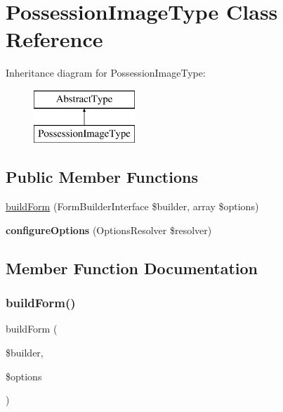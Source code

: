 \hypertarget{class_app_1_1_forms_1_1_possession_image_type}{}\section{Possession\+Image\+Type Class Reference}
\label{class_app_1_1_forms_1_1_possession_image_type}
Inheritance diagram for Possession\+Image\+Type\+:\begin{figure}[H]
\begin{center}
\leavevmode
\includegraphics[height=2.000000cm]{class_app_1_1_forms_1_1_possession_image_type}
\end{center}
\end{figure}
\subsection*{Public Member Functions}
\begin{DoxyCompactItemize}
\item 
\mbox{\hyperlink{class_app_1_1_forms_1_1_possession_image_type_a83c3745710374f9c5a1eb0686fe2dfab}{build\+Form}} (Form\+Builder\+Interface \$builder, array \$options)
\item 
\mbox{\label{class_app_1_1_forms_1_1_possession_image_type_a8ff68a86f5090b5df973286836e46ead}} 
{\bfseries configure\+Options} (Options\+Resolver \$resolver)
\end{DoxyCompactItemize}


\subsection{Member Function Documentation}
\mbox{\label{class_app_1_1_forms_1_1_possession_image_type_a83c3745710374f9c5a1eb0686fe2dfab}} 
\subsubsection{\texorpdfstring{buildForm()}{buildForm()}}
{\footnotesize\ttfamily build\+Form (\begin{DoxyParamCaption}\item[{Form\+Builder\+Interface}]{\$builder,  }\item[{array}]{\$options }\end{DoxyParamCaption})}


